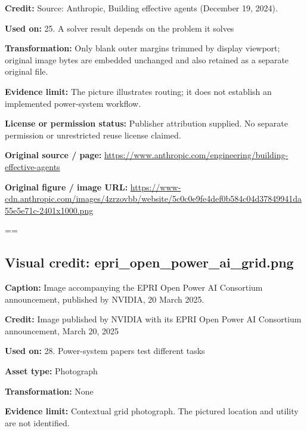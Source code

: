 \documentclass[10pt,letterpaper]{article}
\begin{document}
\textbf{Credit:} Source: Anthropic, Building effective agents (December 19, 2024).\par
\textbf{Used on:} 25. A solver result depends on the problem it solves\par
\textbf{Transformation:} Only blank outer margins trimmed by display viewport; original image bytes are embedded unchanged and also retained as a separate original file.\par
\textbf{Evidence limit:} The picture illustrates routing; it does not establish an implemented power-system workflow.\par
\textbf{License or permission status:} Publisher attribution supplied. No separate permission or unrestricted reuse license claimed.\par
\textbf{Original source / page:} \href{https://www.anthropic.com/engineering/building-effective-agents}{\small\ttfamily https:/\allowbreak{}/\allowbreak{}www.\allowbreak{}anthropic.\allowbreak{}com/\allowbreak{}engineering/\allowbreak{}building-\allowbreak{}effective-\allowbreak{}agents}\par
\textbf{Original figure / image URL:} \href{https://www-cdn.anthropic.com/images/4zrzovbb/website/5c0c0e9fe4def0b584c04d37849941da55e5e71c-2401x1000.png}{\small\ttfamily https:/\allowbreak{}/\allowbreak{}www-\allowbreak{}cdn.\allowbreak{}anthropic.\allowbreak{}com/\allowbreak{}images/\allowbreak{}4zrzovbb/\allowbreak{}website/\allowbreak{}5c0c0e9fe4def0b584c04d37849941da55e5e71c-\allowbreak{}2401x1000.\allowbreak{}png}\par
\egroup\par\noindent\box\readingEntry\par\medskip
\setbox\readingEntry=\vbox\bgroup\hsize=\linewidth\subsection*{Visual credit: epri\_open\_power\_ai\_grid.png}
\textbf{Caption:} Image accompanying the EPRI Open Power AI Consortium announcement, published by NVIDIA, 20 March 2025.\par
\textbf{Credit:} Image published by NVIDIA with its EPRI Open Power AI Consortium announcement, March 20, 2025\par
\textbf{Used on:} 28. Power-system papers test different tasks\par
\textbf{Asset type:} Photograph\par
\textbf{Transformation:} None\par
\textbf{Evidence limit:} Contextual grid photograph. The pictured location and utility are not identified.\par
\end{document}
